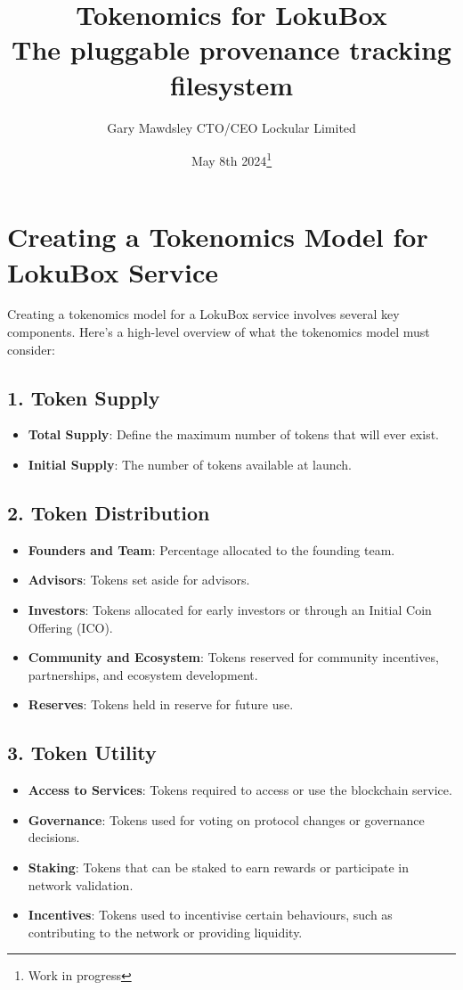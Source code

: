 \documentclass{tufte-handout}
\title{Tokenomics for LokuBox \\
\large The pluggable provenance tracking filesystem}
\author[Gary Mawdsley]{Gary Mawdsley CTO/CEO Lockular Limited}
\date{May 8th 2024\thanks{Work in progress}}  %
\begin{document}
\section*{Creating a Tokenomics Model for LokuBox Service}

Creating a tokenomics model for a LokuBox service involves several key components. Here's a high-level overview of what the tokenomics model must consider:

\subsection*{1. Token Supply}
\begin{itemize}
    \item \textbf{Total Supply}: Define the maximum number of tokens that will ever exist.
    \item \textbf{Initial Supply}: The number of tokens available at launch.
\end{itemize}

\subsection*{2. Token Distribution}
\begin{itemize}
    \item \textbf{Founders and Team}: Percentage allocated to the founding team.
    \item \textbf{Advisors}: Tokens set aside for advisors.
    \item \textbf{Investors}: Tokens allocated for early investors or through an Initial Coin Offering (ICO).
    \item \textbf{Community and Ecosystem}: Tokens reserved for community incentives, partnerships, and ecosystem development.
    \item \textbf{Reserves}: Tokens held in reserve for future use.
\end{itemize}

\subsection*{3. Token Utility}
\begin{itemize}
    \item \textbf{Access to Services}: Tokens required to access or use the blockchain service.
    \item \textbf{Governance}: Tokens used for voting on protocol changes or governance decisions.
    \item \textbf{Staking}: Tokens that can be staked to earn rewards or participate in network validation.
    \item \textbf{Incentives}: Tokens used to incentivise certain behaviours, such as contributing to the network or providing liquidity.
\end{itemize}
\end{document}

